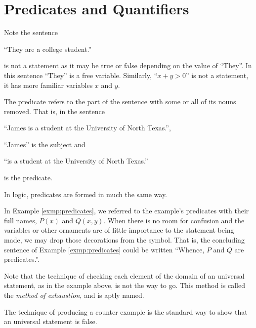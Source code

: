 \guard

\section{Predicates and Quantifiers}
\label{sec:predicatesAndQuantifiers}

Note the sentence
  \begin{center}
    ``They are a college student.''
  \end{center}
  is not a statement as it may be true or false depending on the value of ``They''.
In this sentence ``They'' is a free variable.
Similarly, ``$x+y>0$'' is not a statement, it has more familiar variables $x$ and $y$.

The predicate refers to the part of the sentence with some or all of its nouns removed.
That is, in the sentence
  \begin{center}
    ``James is a student at the University of North Texas.'',
  \end{center}
  ``James'' is the subject and
  \begin{center}
    ``is a student at the University of North Texas.''
  \end{center}
  is the predicate.

In logic, predicates are formed in much the same way.

In Example \ref{exmp:predicates}, we referred to the example's predicates with their full names, $P(x)$ and $Q(x,y)$.
When there is no room for confusion and the variables or other ornaments are of little importance to the statement being made, we may drop those decorations from the symbol.
That is, the concluding sentence of Example \ref{exmp:predicates} could be written ``Whence, $P$ and $Q$ are predicates.''.









Note that the technique of checking each element of the domain of an universal statement, as in the example above, is not the way to go.
This method is called the \emph{method of exhaustion}, and is aptly named.


The technique of producing a counter example is the standard way to show that  an universal statement is false.


